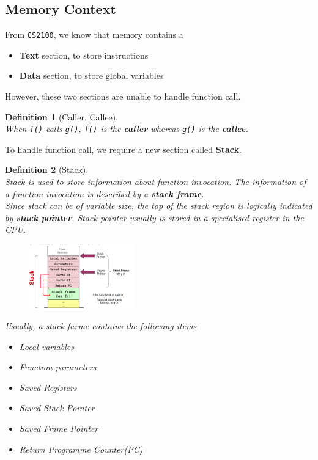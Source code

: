 \documentclass[12pt]{article}
\newtheorem{definition}{Definition}[section]
\theoremstyle{definition}
\begin{document}
\subsection{Memory Context}
From \texttt{CS2100}, we know that memory contains a 
\begin{itemize}
  \item \textbf{Text} section, to store instructions
  \item \textbf{Data} section, to store global variables
\end{itemize}
However, these two sections are unable to handle function call.
\begin{definition}[Caller, Callee]
\hfill\\\normalfont When \texttt{f()} calls \texttt{g()}, \texttt{f()} is the \textbf{caller} whereas \texttt{g()} is the \textbf{callee}.
\end{definition}
To handle function call, we require a new section called \textbf{Stack}.
\begin{definition}[Stack]
\hfill\\\normalfont Stack is used to store information about function invocation. The information of a function invocation is described by a \textbf{stack frame}.\\
Since stack can be of variable size, the top of the stack region is logically indicated by \textbf{stack pointer}. Stack pointer usually is stored in a specialised register in the CPU.
\begin{figure}[h]
\centering
\includegraphics[width=0.4\textwidth]{2_1.png}
\end{figure}
Usually, a stack farme contains the following items
\begin{itemize}
  \item Local variables
  \item Function parameters
  \item Saved Registers
  \item Saved Stack Pointer
  \item Saved Frame Pointer
  \item Return Programme Counter(PC)
\end{itemize}
\end{definition}
\end{document}
